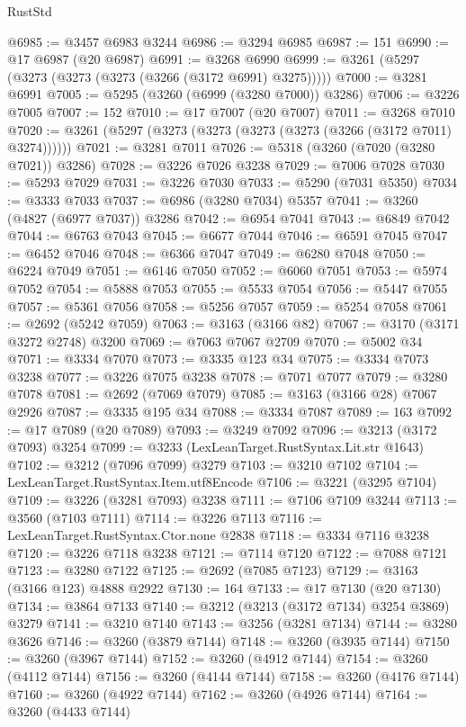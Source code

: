 \begin{lexlean}{RustStd}
\begin{coremodule}
@6985 := @3457 @6983 @3244
@6986 := @3294 @6985
@6987 := 151
@6990 := @17 @6987 (@20 @6987)
@6991 := @3268 @6990
@6999 := @3261 (@5297 (@3273 (@3273 (@3273 (@3266 (@3172 @6991) @3275)))))
@7000 := @3281 @6991
@7005 := @5295 (@3260 (@6999 (@3280 @7000)) @3286)
@7006 := @3226 @7005
@7007 := 152
@7010 := @17 @7007 (@20 @7007)
@7011 := @3268 @7010
@7020 := @3261 (@5297 (@3273 (@3273 (@3273 (@3273 (@3266 (@3172 @7011) @3274))))))
@7021 := @3281 @7011
@7026 := @5318 (@3260 (@7020 (@3280 @7021)) @3286)
@7028 := @3226 @7026 @3238
@7029 := @7006 @7028
@7030 := @5293 @7029
@7031 := @3226 @7030
@7033 := @5290 (@7031 @5350)
@7034 := @3333 @7033
@7037 := @6986 (@3280 @7034) @5357
@7041 := @3260 (@4827 (@6977 @7037)) @3286
@7042 := @6954 @7041
@7043 := @6849 @7042
@7044 := @6763 @7043
@7045 := @6677 @7044
@7046 := @6591 @7045
@7047 := @6452 @7046
@7048 := @6366 @7047
@7049 := @6280 @7048
@7050 := @6224 @7049
@7051 := @6146 @7050
@7052 := @6060 @7051
@7053 := @5974 @7052
@7054 := @5888 @7053
@7055 := @5533 @7054
@7056 := @5447 @7055
@7057 := @5361 @7056
@7058 := @5256 @7057
@7059 := @5254 @7058
@7061 := @2692 (@5242 @7059)
@7063 := @3163 (@3166 @82)
@7067 := @3170 (@3171 @3272 @2748) @3200
@7069 := @7063 @7067 @2709
@7070 := @5002 @34
@7071 := @3334 @7070
@7073 := @3335 @123 @34
@7075 := @3334 @7073 @3238
@7077 := @3226 @7075 @3238
@7078 := @7071 @7077
@7079 := @3280 @7078
@7081 := @2692 (@7069 @7079)
@7085 := @3163 (@3166 @28) @7067 @2926
@7087 := @3335 @195 @34
@7088 := @3334 @7087
@7089 := 163
@7092 := @17 @7089 (@20 @7089)
@7093 := @3249 @7092
@7096 := @3213 (@3172 @7093) @3254
@7099 := @3233 (LexLeanTarget.RustSyntax.Lit.str @1643)
@7102 := @3212 (@7096 @7099) @3279
@7103 := @3210 @7102
@7104 := LexLeanTarget.RustSyntax.Item.utf8Encode
@7106 := @3221 (@3295 @7104)
@7109 := @3226 (@3281 @7093) @3238
@7111 := @7106 @7109 @3244
@7113 := @3560 (@7103 @7111)
@7114 := @3226 @7113
@7116 := LexLeanTarget.RustSyntax.Ctor.none @2838
@7118 := @3334 @7116 @3238
@7120 := @3226 @7118 @3238
@7121 := @7114 @7120
@7122 := @7088 @7121
@7123 := @3280 @7122
@7125 := @2692 (@7085 @7123)
@7129 := @3163 (@3166 @123) @4888 @2922
@7130 := 164
@7133 := @17 @7130 (@20 @7130)
@7134 := @3864 @7133
@7140 := @3212 (@3213 (@3172 @7134) @3254 @3869) @3279
@7141 := @3210 @7140
@7143 := @3256 (@3281 @7134)
@7144 := @3280 @3626
@7146 := @3260 (@3879 @7144)
@7148 := @3260 (@3935 @7144)
@7150 := @3260 (@3967 @7144)
@7152 := @3260 (@4912 @7144)
@7154 := @3260 (@4112 @7144)
@7156 := @3260 (@4144 @7144)
@7158 := @3260 (@4176 @7144)
@7160 := @3260 (@4922 @7144)
@7162 := @3260 (@4926 @7144)
@7164 := @3260 (@4433 @7144)

\end{coremodule}
\end{lexlean}
